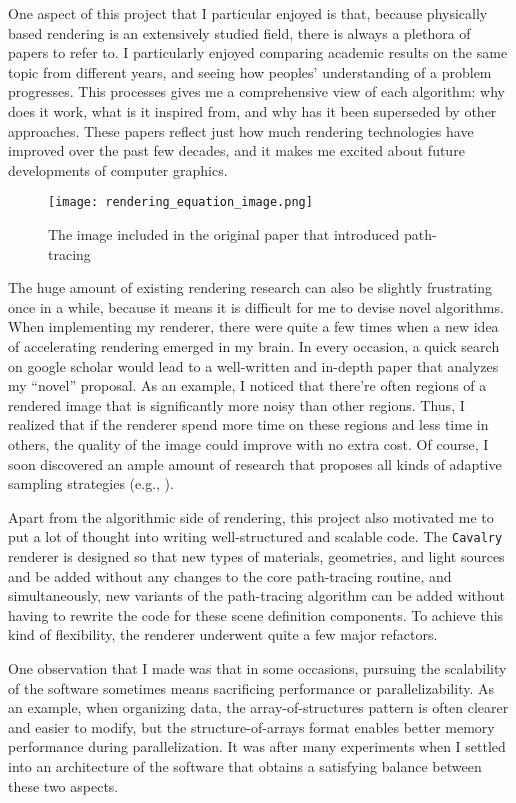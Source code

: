 One aspect of this project that I particular enjoyed is that, because physically based rendering is an extensively studied field, there is always a plethora of papers to refer to. I particularly enjoyed comparing academic results on the same topic from different years, and seeing how peoples' understanding of a problem progresses. This processes gives me a comprehensive view of each algorithm: why does it work, what is it inspired from, and why has it been superseded by other approaches. These papers reflect just how much rendering technologies have improved over the past few decades, and it makes me excited about future developments of computer graphics.

\begin{figure}[H]
    \centering
    \texttt{[image: rendering\_equation\_image.png]}
    \caption{The image included in the original paper\cite{rendering_equation} that introduced path-tracing}
\end{figure}

The huge amount of existing rendering research can also be slightly frustrating once in a while, because it means it is difficult for me to devise novel algorithms. When implementing my renderer, there were quite a few times when a new idea of accelerating rendering emerged in my brain. In every occasion, a quick search on google scholar would lead to a well-written and in-depth paper that analyzes my ``novel'' proposal. As an example, I noticed that there're often regions of a rendered image that is significantly more noisy than other regions. Thus, I realized that if the renderer spend more time on these regions and less time in others, the quality of the image could improve with no extra cost. Of course, I soon discovered an ample amount of research that proposes all kinds of adaptive sampling strategies (e.g., \cite{rousselle2011adaptive}). 

Apart from the algorithmic side of rendering, this project also motivated me to put a lot of thought into writing well-structured and scalable code. The \texttt{Cavalry} renderer is designed so that new types of materials, geometries, and light sources and be added without any changes to the core path-tracing routine, and simultaneously, new variants of the path-tracing algorithm can be added without having to rewrite the code for these scene definition components. To achieve this kind of flexibility, the renderer underwent quite a few major refactors.

One observation that I made was that in some occasions, pursuing the scalability of the software sometimes means sacrificing performance or parallelizability. As an example, when organizing data, the array-of-structures pattern is often clearer and easier to modify, but the structure-of-arrays format enables better memory performance during parallelization. It was after many experiments when I settled into an architecture of the software that obtains a satisfying balance between these two aspects.


